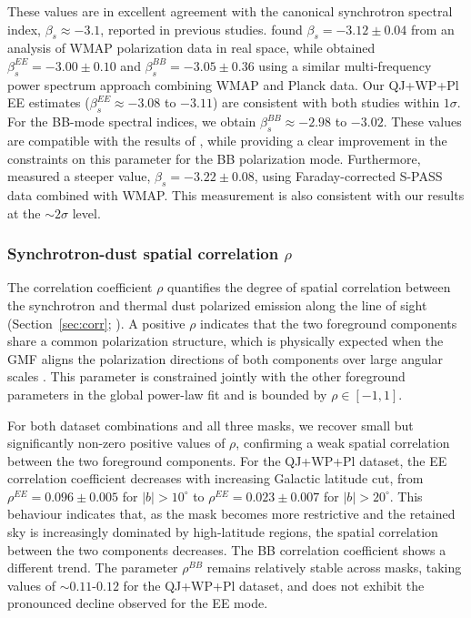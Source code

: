 These values are in excellent agreement with the canonical synchrotron spectral index, $\beta_s \approx -3.1$, reported in previous studies. \cite{Fuskeland_2014} found $\beta_s = -3.12 \pm 0.04$ from an analysis of WMAP polarization data in real space, while \citet{Martire_2022} obtained $\beta_s^{EE} = -3.00 \pm 0.10$ and $\beta_s^{BB} = -3.05 \pm 0.36$ using a similar multi-frequency power spectrum approach combining WMAP and Planck data. Our QJ+WP+Pl EE estimates ($\beta_s^{EE} \approx -3.08$ to $-3.11$) are consistent with both studies within $1\sigma$. For the BB-mode spectral indices, we obtain $\beta_s^{BB} \approx -2.98$ to $-3.02$. These values are compatible with the results of \citet{Martire_2022}, while providing a clear improvement in the constraints on this parameter for the BB polarization mode. Furthermore, \citet{Fuskeland_2021} measured a steeper value, $\beta_s = -3.22 \pm 0.08$, using Faraday-corrected S-PASS data combined with WMAP. This measurement is also consistent with our results at the $\sim 2\sigma$ level.



\subsubsection{Synchrotron-dust spatial correlation $\rho$}
\label{sec:rho_pl}

The correlation coefficient $\rho$ quantifies the degree of spatial correlation between the synchrotron and thermal dust polarized emission along the line of sight (Section~\ref{sec:corr}; \citealp{Choi_2015}). A positive $\rho$ indicates that the two foreground components share a common polarization structure, which is physically expected when the GMF aligns the polarization directions of both components over large angular scales \citep{Choi_2015}. This parameter is constrained jointly with the other foreground parameters in the global power-law fit and is bounded by $\rho \in [-1, 1]$.

For both dataset combinations and all three masks, we recover small but significantly non-zero positive values of $\rho$, confirming a weak spatial correlation between the two foreground components. For the QJ+WP+Pl dataset, the EE correlation coefficient decreases with increasing Galactic latitude cut, from $\rho^{EE} = 0.096 \pm 0.005$ for $|b| > 10^\circ$ to $\rho^{EE} = 0.023 \pm 0.007$ for $|b| > 20^\circ$. This behaviour indicates that, as the mask becomes more restrictive and the retained sky is increasingly dominated by high-latitude regions, the spatial correlation between the two components decreases. The BB correlation coefficient shows a different trend. The parameter $\rho^{BB}$ remains relatively stable across masks, taking values of $\sim 0.11$-$0.12$ for the QJ+WP+Pl dataset, and does not exhibit the pronounced decline observed for the EE mode.

